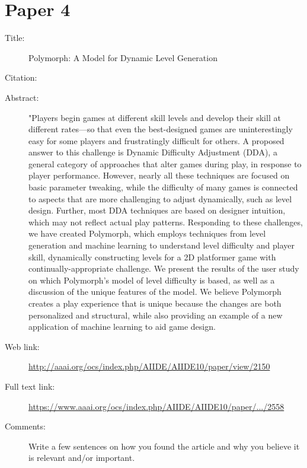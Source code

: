 \documentclass{scrartcl}
\begin{document}
\section*{Paper 4}
\begin{description}
\item[Title:] Polymorph: A Model for Dynamic Level Generation
\item[Citation:] \cite{Jennings:2010}
\item[Abstract:] "Players begin games at different skill levels and develop their skill at different rates—so that even the best-designed games are uninterestingly easy for some players and frustratingly difficult for others. A proposed answer to this challenge is Dynamic Difficulty Adjustment (DDA), a general category of approaches that alter games during play, in response to player performance. However, nearly all these techniques are focused on basic parameter tweaking,
while the difficulty of many games is connected to aspects that are more challenging to adjust dynamically, such as level design. Further, most DDA techniques are based on designer intuition, which may not reflect actual play patterns. Responding to these challenges, we have created Polymorph, which employs techniques from level generation and machine learning to understand level difficulty and player skill, dynamically constructing levels for a 2D platformer game with continually-appropriate challenge. We present the results of the user study on which Polymorph's model of level difficulty is based, as well as a discussion of the unique features of the model. We believe Polymorph creates a play experience that is unique because the changes are both personalized and structural, while also providing an example of a new application of machine learning to aid game design.
\item[Web link:] \url{http://aaai.org/ocs/index.php/AIIDE/AIIDE10/paper/view/2150}
\item[Full text link:] \url{https://www.aaai.org/ocs/index.php/AIIDE/AIIDE10/paper/.../2558}
\item[Comments:] Write a few sentences on how you found the article and why you believe it is relevant and/or important.
\end{description}
\end{document}

